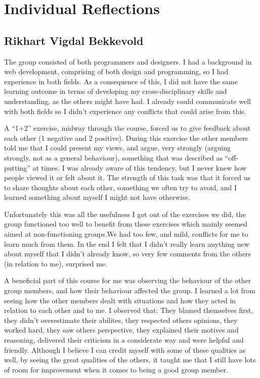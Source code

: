 \section{Individual Reflections}
\subsection{Rikhart Vigdal Bekkevold}
The group consisted of both programmers and designers. I had a background in web development, comprising of both design and programming, so I had experience in both fields. As a consequence of this, I did not have the same learning outcome in terms of developing my cross-disciplinary skills and understanding, as the others might have had. I already could communicate well with both fields so I didn’t experience any conflicts that could arise from this.

A “1+2” exercise, midway through the course, forced us to give feedback about each other (1 negative and 2 positive). During this exercise the other members told me that I could present my views, and argue, very strongly (arguing strongly, not as a general behaviour), something that was described as “off-putting” at times. I was already aware of this tendency, but I never knew how people viewed it or felt about it. The strength of this task was that it forced us to share thoughts about each other, something we often try to avoid, and I learned something about myself I might not have otherwise.

Unfortunately this was all the usefulness I got out of the exercises we did, the group functioned too well to benefit from these exercises which mainly seemed aimed at non-functioning groups.We had too few, and mild, conflicts for me to learn much from them. In the end I felt that I didn’t really learn anything new about myself that I didn’t already know, so very few comments from the others (in relation to me), surprised me.

A beneficial part of this course for me was observing the behaviour of the other group members, and how their behaviour affected the group. I learned a lot from seeing how the other members dealt with situations and how they acted in relation to each other and to me. I observed that: They blamed themselves first, they didn’t overestimate their abilites, they respected others opinions, they worked hard, they saw others perspective, they explained their motives and reasoning, delivered their criticism in a considerate way and were helpful and friendly. Although I believe I can credit myself with some of these qualities as well, by seeing the great qualities of the others, it taught me that I still have lots of room for improvement when it comes to being a good group member.
 
